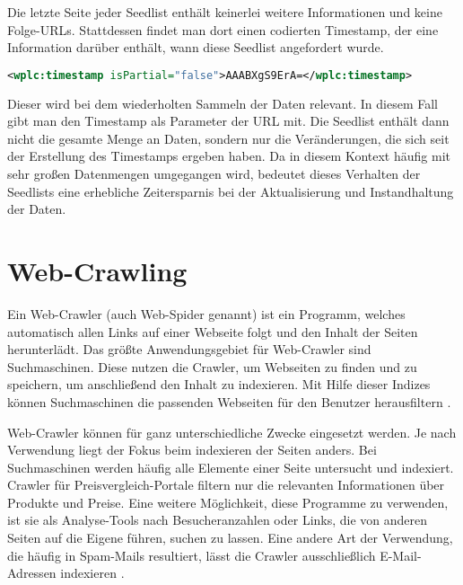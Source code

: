 Die letzte Seite jeder Seedlist enthält keinerlei weitere Informationen und keine Folge-URLs. Stattdessen findet man dort einen codierten Timestamp, der eine Information darüber enthält, wann diese Seedlist angefordert wurde. \\

\noindent
\begin{minipage}{\linewidth}
\begin{lstlisting}[title=Beispiel eines Timestamps: AAABXgS9ErA, language=XML]
<wplc:timestamp isPartial="false">AAABXgS9ErA=</wplc:timestamp>
\end{lstlisting}
\end{minipage}

Dieser wird bei dem wiederholten Sammeln der Daten relevant. In diesem Fall gibt man den Timestamp als Parameter der URL mit. Die Seedlist enthält dann nicht die gesamte Menge an Daten, sondern nur die Veränderungen, die sich seit der Erstellung des Timestamps ergeben haben. Da in diesem Kontext häufig mit sehr großen Datenmengen umgegangen wird, bedeutet dieses Verhalten der Seedlists eine erhebliche Zeitersparnis bei der Aktualisierung und Instandhaltung der Daten.


\newpage

\section{Web-Crawling}
Ein Web-Crawler (auch Web-Spider genannt) ist ein Programm, welches automatisch allen Links auf einer Webseite folgt und den Inhalt der Seiten herunterlädt. Das größte Anwendungsgebiet für Web-Crawler sind Suchmaschinen. Diese nutzen die Crawler, um Webseiten zu finden und zu speichern, um anschließend den Inhalt zu indexieren. Mit Hilfe dieser Indizes können Suchmaschinen die passenden Webseiten für den Benutzer herausfiltern \cite{crawl}.

Web-Crawler können für ganz unterschiedliche Zwecke eingesetzt werden. Je nach Verwendung liegt der Fokus beim indexieren der Seiten anders. Bei Suchmaschinen werden häufig alle Elemente einer Seite untersucht und indexiert. Crawler für Preisvergleich-Portale filtern nur die relevanten Informationen über Produkte und Preise. Eine weitere Möglichkeit, diese Programme zu verwenden, ist sie als Analyse-Tools nach Besucheranzahlen oder Links, die von anderen Seiten auf die Eigene führen, suchen zu lassen. Eine andere Art der Verwendung, die häufig in Spam-Mails resultiert, lässt die Crawler ausschließlich E-Mail-Adressen indexieren \cite{ryte}.

